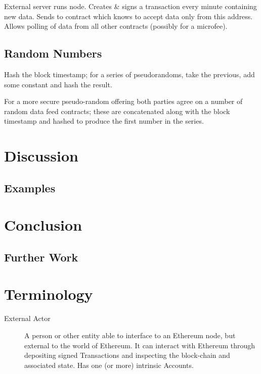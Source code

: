 \documentclass[9pt,oneside]{amsart}
\begin{document}
\begin{multicols}{2}
External server runs node. Creates \& signs a transaction every minute containing new data. Sends to contract which knows to accept data only from this address. Allows polling of data from all other contracts (possibly for a microfee).

\subsection{Random Numbers}

Hash the block timestamp; for a series of pseudorandoms, take the previous, add some constant and hash the result.

For a more secure pseudo-random offering both parties agree on a number of random data feed contracts; these are concatenated along with the block timestamp and hashed to produce the first number in the series.

\section{Discussion} \label{ch:discussion}

\subsection{Examples} \label{ch:examples}

\section{Conclusion} \label{ch:conclusion}

\subsection{Further Work} \label{ch:further}




\appendix

\section{Terminology}

\begin{description}
\item[External Actor] A person or other entity able to interface to an Ethereum node, but external to the world of Ethereum. It can interact with Ethereum through depositing signed Transactions and inspecting the block-chain and associated state. Has one (or more) intrinsic Accounts.


\end{description}
\end{multicols}
\end{document}
